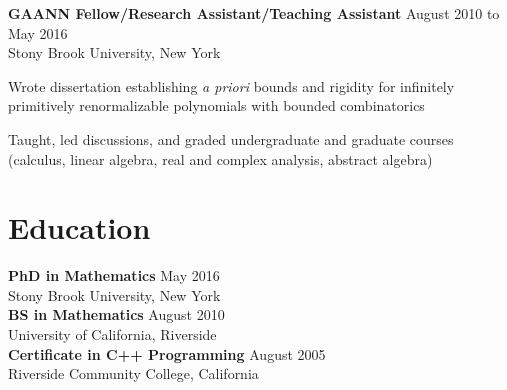 \documentclass[11pt]{article}
\begin{document}
\noindent\textbf{GAANN Fellow/Research Assistant/Teaching Assistant} \hfill August 2010 to May 2016\\
Stony Brook University, New York
\begin{inparaitem}
\item Wrote dissertation establishing \textit{a priori} bounds and rigidity for infinitely primitively renormalizable polynomials with bounded combinatorics
\item Taught, led discussions, and graded undergraduate and graduate courses (calculus, linear algebra, real and complex analysis, abstract algebra)
\end{inparaitem}

\section*{Education}
\noindent\textbf{PhD in Mathematics} \hfill May 2016\\
Stony Brook University, New York\\
\noindent\textbf{BS in Mathematics} \hfill August 2010\\
University of California, Riverside\\
\noindent\textbf{Certificate in C++ Programming} \hfill August 2005\\
Riverside Community College, California
\end{document}
